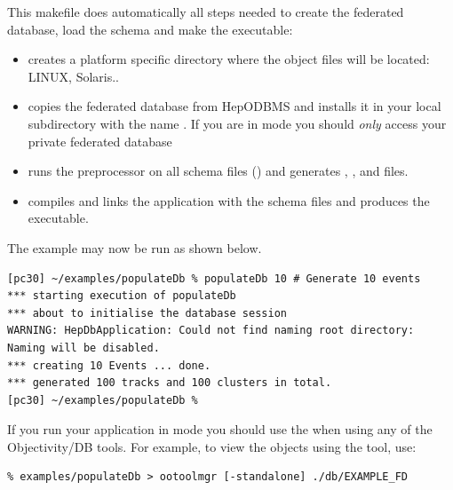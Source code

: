 \par

This makefile does automatically all steps needed to create the federated database, load the schema and make the executable: 

\begin{itemize}

\item creates a platform specific directory where the object files
will be located: LINUX, Solaris.. 
\item copies the  federated database from
HepODBMS and installs it in your local subdirectory
 with the name
. If you are in  mode
you should \emph{only} access your private federated
database
\item runs the  preprocessor on all schema files
() and generates ,
, and  files.
\item compiles and links the  application with
the schema files and produces the executable.\end{itemize}

\par

The example may now be run as shown below.
\begin{verbatim}
[pc30] ~/examples/populateDb % populateDb 10 # Generate 10 events
*** starting execution of populateDb 
*** about to initialise the database session 
WARNING: HepDbApplication: Could not find naming root directory: Naming will be disabled. 
*** creating 10 Events ... done. 
*** generated 100 tracks and 100 clusters in total. 
[pc30] ~/examples/populateDb %
\end{verbatim}

\par
{}If you run your application in 
mode you should use the  when using any of the Objectivity/DB tools.
For example, to view the objects using the  tool, use:

\begin{verbatim}
% examples/populateDb > ootoolmgr [-standalone] ./db/EXAMPLE_FD 
\end{verbatim}

\par

